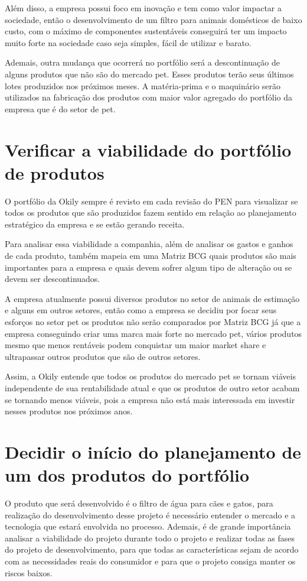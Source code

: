 \documentclass[
	12pt,				%
	openright,			%
	oneside,			%
	a4paper,			%
	english,			%
	french,				%
	spanish,			%
	brazil				%
	]{abntex2}
\begin{document}
Além disso, a empresa possui foco em inovação e tem como valor impactar a sociedade, então o desenvolvimento de um filtro para animais domésticos de baixo custo, com o máximo de componentes sustentáveis conseguirá ter um impacto muito forte na sociedade caso seja simples, fácil de utilizar e barato.

Ademais, outra mudança que ocorrerá no portfólio será a descontinuação de alguns produtos que não são do mercado pet. Esses produtos terão seus últimos lotes produzidos nos próximos meses. A matéria-prima e o maquinário serão utilizados na fabricação dos produtos com maior valor agregado do portfólio da empresa que é do setor de pet. 


\section{Verificar a viabilidade do portfólio de produtos}

O portfólio da Okily sempre é revisto em cada revisão do PEN para visualizar se todos os produtos que são produzidos fazem sentido em relação ao planejamento estratégico da empresa e se estão gerando receita.

Para analisar essa viabilidade a companhia, além de analisar os gastos e ganhos de cada produto, também mapeia em uma Matriz BCG quais produtos são mais importantes para a empresa e quais devem sofrer algum tipo de alteração ou se devem ser descontinuados.

A empresa atualmente possui diversos produtos no setor de animais de estimação e alguns em outros setores, então como a empresa se decidiu por focar seus esforços no setor pet os produtos não serão comparados por Matriz BCG já que a empresa conseguindo criar uma marca mais forte no mercado pet, vários produtos mesmo que menos rentáveis podem conquistar um maior market share e ultrapassar outros produtos que são de outros setores.

Assim, a Okily entende que todos os produtos do mercado pet se tornam viáveis independente de sua rentabilidade atual e que os produtos de outro setor acabam se tornando menos viáveis, pois a empresa não está mais interessada em investir nesses produtos nos próximos anos.


\section{Decidir o início do planejamento de um dos produtos do portfólio}

O produto que será desenvolvido é o filtro de água para cães e gatos, para realização do desenvolvimento desse projeto é necessário entender o mercado e a tecnologia que estará envolvida no processo. Ademais, é de grande importância analisar a viabilidade do projeto durante todo o projeto e realizar todas as fases do projeto de desenvolvimento, para que todas as características sejam de acordo com as necessidades reais do consumidor e para que o projeto consiga manter os riscos baixos.
\end{document}
